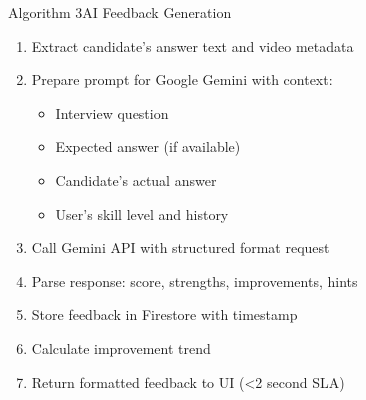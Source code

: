 \documentclass{beamer}
\begin{document}
\begin{frame}{Algorithm 3}{AI Feedback Generation}
\begin{enumerate}
    \item Extract candidate's answer text and video metadata
    \item Prepare prompt for Google Gemini with context:
    \begin{itemize}
        \item Interview question
        \item Expected answer (if available)
        \item Candidate's actual answer
        \item User's skill level and history
    \end{itemize}
    \item Call Gemini API with structured format request
    \item Parse response: score, strengths, improvements, hints
    \item Store feedback in Firestore with timestamp
    \item Calculate improvement trend
    \item Return formatted feedback to UI (<2 second SLA)
\end{enumerate}
\end{frame}
\end{document}
